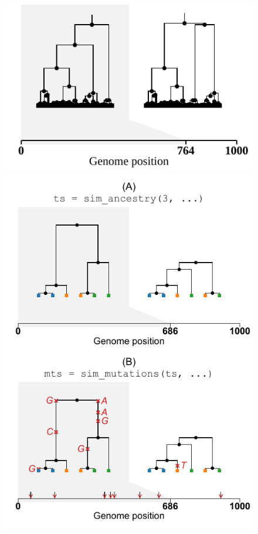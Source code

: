 \documentclass{article}
\begin{document}
\begin{figure}
    \includegraphics{illustrations/unmutated_tree}
    \includegraphics{illustrations/mutated_tree}

\end{figure}
\end{document}
